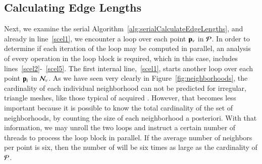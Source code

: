 %
%
%
%
%
%
%
%

%
%
\subsection{Calculating Edge Lengths}
\label{ch5sPAssCEL}
Next, we examine the serial Algorithm~\ref{alg:serialCalculateEdgeLengths}, and already in line~\ref{scel1}, we encounter a loop over each point $\mathbf{p}_v$ in $\mathcal{P}$. In order to determine if each iteration of the loop may be computed in parallel, an analysis of every operation in the loop block is required, which in this case, includes lines~\ref{scel2}-~\ref{scel5}. The first internal line,~\ref{scel1}, starts another loop over each point $\mathbf{p}_i$ in $\mathcal{N}_v$.  As we have seen very clearly in Figure~\ref{fig:neighborhoods}, the cardinality of each individual neighborhood can not be predicted for irregular, triangle meshes, like those typical of acquired \tdd{}. However, that becomes less important because it is possible to know the total cardinality of the set of neighborhoods, by counting the size of each neighborhood a posteriori. With that information, we may unroll the two loops and instruct a certain number of threads to process the loop block in parallel. If the average number of neighbors per point is six, then the number of will be six times as large as the cardinality of $\mathcal{P}$.

